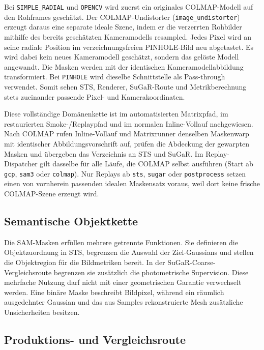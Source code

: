 Bei \texttt{SIMPLE\_RADIAL} und \texttt{OPENCV} wird zuerst ein originales
COLMAP-Modell auf den Rohframes geschätzt. Der COLMAP-Undistorter
(\texttt{image\_undistorter}) erzeugt daraus eine separate ideale Szene, indem
er die verzerrten Rohbilder mithilfe des bereits geschätzten Kameramodells
resampled. Jedes Pixel wird an seine radiale Position im verzeichnungsfreien
PINHOLE-Bild neu abgetastet. Es wird dabei kein neues Kameramodell geschätzt,
sondern das gelöste Modell angewandt. Die Masken werden mit der identischen
Kameramodellabbildung transformiert. Bei \texttt{PINHOLE} wird dieselbe
Schnittstelle als Pass-through verwendet. Somit sehen STS, Renderer,
SuGaR-Route und Metrikberechnung stets zueinander passende Pixel- und
Kamerakoordinaten.

Diese vollständige Domänenkette ist im automatisierten Matrixpfad, im
restaurierten Smoke-/Replaypfad und im normalen Inline-Vollauf nachgewiesen.
Nach COLMAP rufen Inline-Vollauf und Matrixrunner denselben Maskenwarp mit
identischer Abbildungsvorschrift auf, prüfen die Abdeckung der gewarpten
Masken und übergeben das Verzeichnis  an STS und
SuGaR. Im Replay-Dispatcher gilt dasselbe für alle Läufe, die COLMAP selbst ausführen
(Start ab \texttt{gcp}, \texttt{sam3} oder \texttt{colmap}). Nur Replays ab
\texttt{sts}, \texttt{sugar} oder \texttt{postprocess} setzen einen von
vornherein passenden idealen Maskensatz voraus, weil dort keine frische
COLMAP-Szene erzeugt wird.

\subsection{Semantische Objektkette}

Die SAM-Masken erfüllen mehrere getrennte Funktionen. Sie definieren die
Objektzuordnung in STS, begrenzen die Auswahl der Ziel-Gaussians und stellen die
Objektregion für die Bildmetriken bereit. In der SuGaR-Coarse-Vergleichsroute
begrenzen sie zusätzlich die photometrische Supervision. Diese mehrfache
Nutzung darf nicht mit einer geometrischen Garantie verwechselt werden. Eine
binäre Maske beschreibt Bildpixel, während ein räumlich ausgedehnter Gaussian
und das aus Samples rekonstruierte Mesh zusätzliche Unsicherheiten besitzen.

\subsection{Produktions- und Vergleichsroute}

